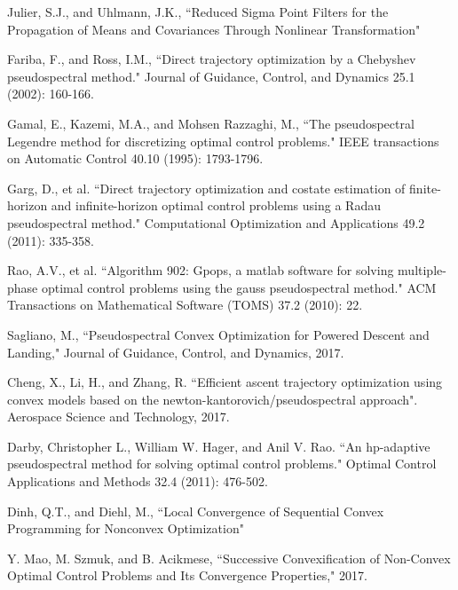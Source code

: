 \documentclass[10pt,a4paper]{article}
\begin{document}
\begin{thebibliography}{1}
		Julier, S.J., and Uhlmann, J.K., ``Reduced Sigma Point Filters for the Propagation of Means and Covariances Through Nonlinear Transformation"
				
		Fariba, F., and Ross, I.M., ``Direct trajectory optimization by a Chebyshev pseudospectral method." Journal of Guidance, Control, and Dynamics 25.1 (2002): 160-166.
		
		Gamal, E., Kazemi, M.A., and Mohsen Razzaghi, M., ``The pseudospectral Legendre method for discretizing optimal control problems." IEEE transactions on Automatic Control 40.10 (1995): 1793-1796.
		
		Garg, D., et al. ``Direct trajectory optimization and costate estimation of finite-horizon and infinite-horizon optimal control problems using a Radau pseudospectral method." Computational Optimization and Applications 49.2 (2011): 335-358.
		
		Rao, A.V., et al. ``Algorithm 902: Gpops, a matlab software for solving multiple-phase optimal control problems using the gauss pseudospectral method." ACM Transactions on Mathematical Software (TOMS) 37.2 (2010): 22.				
				
		Sagliano, M., ``Pseudospectral Convex Optimization for Powered Descent and Landing," Journal of Guidance, Control, and Dynamics, 2017.
		
		Cheng, X., Li, H., and Zhang, R. ``Efficient ascent trajectory optimization using convex models based on the newton-kantorovich/pseudospectral approach". Aerospace Science and Technology, 2017.
		
		Darby, Christopher L., William W. Hager, and Anil V. Rao. ``An hp-adaptive pseudospectral method for solving optimal control problems." Optimal Control Applications and Methods 32.4 (2011): 476-502.
		
		Dinh, Q.T., and Diehl, M., ``Local Convergence of Sequential Convex Programming for Nonconvex Optimization"
		
		Y. Mao, M. Szmuk, and B. Acikmese, ``Successive Convexification of Non-Convex Optimal Control Problems and Its Convergence Properties," 2017.
		
		

\end{thebibliography}
\end{document}
